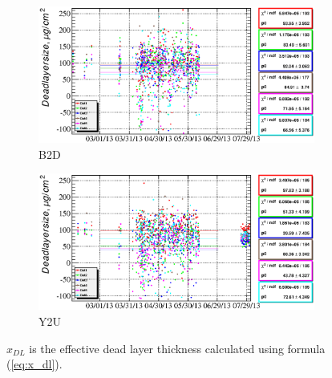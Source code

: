 \documentclass[a4paper,12pt]{article}
\begin{document}
\newcommand\xdllabel{$x_{DL}$ is the effective dead layer thickness calculated using formula (\ref{eq:x_dl}).}
\begin{figure}
\begin{subfigure}[b]{0.5\textwidth}
\includegraphics[width=\textwidth]{gfx/run13_alpha_study/B2D/c_chDeadLayerSize_by_day_B2D.eps}
\caption{B2D}
\end{subfigure}
%
\begin{subfigure}[b]{0.5\textwidth}
\includegraphics[width=\textwidth]{gfx/run13_alpha_study/Y2U/c_chDeadLayerSize_by_day_Y2U.eps}
\caption{Y2U}
\end{subfigure}
\caption{\xdllabel{}}
\label{fig:x_dl}
\end{figure}
\end{document}
